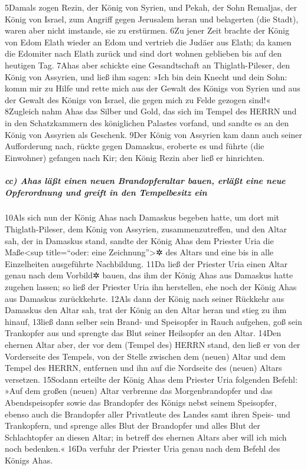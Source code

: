 5Damals zogen Rezin, der König von Syrien, und Pekah, der Sohn Remaljas,
der König von Israel, zum Angriff gegen Jerusalem heran und belagerten
(die Stadt), waren aber nicht imstande, sie zu erstürmen. 6Zu jener Zeit
brachte der König von Edom Elath wieder an Edom und vertrieb die Judäer
aus Elath; da kamen die Edomiter nach Elath zurück und sind dort wohnen
geblieben bis auf den heutigen Tag. 7Ahas aber schickte eine
Gesandtschaft an Thiglath-Pileser, den König von Assyrien, und ließ ihm
sagen: »Ich bin dein Knecht und dein Sohn: komm mir zu Hilfe und rette
mich aus der Gewalt des Königs von Syrien und aus der Gewalt des Königs
von Israel, die gegen mich zu Felde gezogen sind!« 8Zugleich nahm Ahas
das Silber und Gold, das sich im Tempel des HERRN und in den
Schatzkammern des königlichen Palastes vorfand, und sandte es an den
König von Assyrien als Geschenk. 9Der König von Assyrien kam dann auch
seiner Aufforderung nach, rückte gegen Damaskus, eroberte es und führte
(die Einwohner) gefangen nach Kir; den König Rezin aber ließ er
hinrichten.

\hypertarget{cc-ahas-luxe4uxdft-einen-neuen-brandopferaltar-bauen-erluxe4uxdft-eine-neue-opferordnung-und-greift-in-den-tempelbesitz-ein}{%
\subparagraph{cc) Ahas läßt einen neuen Brandopferaltar bauen, erläßt
eine neue Opferordnung und greift in den Tempelbesitz
ein}\label{cc-ahas-luxe4uxdft-einen-neuen-brandopferaltar-bauen-erluxe4uxdft-eine-neue-opferordnung-und-greift-in-den-tempelbesitz-ein}}

10Als sich nun der König Ahas nach Damaskus begeben hatte, um dort mit
Thiglath-Pileser, dem König von Assyrien, zusammenzutreffen, und den
Altar sah, der in Damaskus stand, sandte der König Ahas dem Priester
Uria die Maße\textless sup title=``oder: eine Zeichnung''\textgreater✲
des Altars und eine bis in alle Einzelheiten ausgeführte Nachbildung.
11Da ließ der Priester Uria einen Altar genau nach dem Vorbild✲ bauen,
das ihm der König Ahas aus Damaskus hatte zugehen lassen; so ließ der
Priester Uria ihn herstellen, ehe noch der König Ahas aus Damaskus
zurückkehrte. 12Als dann der König nach seiner Rückkehr aus Damaskus den
Altar sah, trat der König an den Altar heran und stieg zu ihm hinauf,
13ließ dann selber sein Brand- und Speisopfer in Rauch aufgehen, goß
sein Trankopfer aus und sprengte das Blut seiner Heilsopfer an den
Altar. 14Den ehernen Altar aber, der vor dem (Tempel des) HERRN stand,
den ließ er von der Vorderseite des Tempels, von der Stelle zwischen dem
(neuen) Altar und dem Tempel des HERRN, entfernen und ihn auf die
Nordseite des (neuen) Altars versetzen. 15Sodann erteilte der König Ahas
dem Priester Uria folgenden Befehl: »Auf dem großen (neuen) Altar
verbrenne das Morgenbrandopfer und das Abendspeisopfer sowie das
Brandopfer des Königs nebst seinem Speisopfer, ebenso auch die
Brandopfer aller Privatleute des Landes samt ihren Speis- und
Trankopfern, und sprenge alles Blut der Brandopfer und alles Blut der
Schlachtopfer an diesen Altar; in betreff des ehernen Altars aber will
ich mich noch bedenken.« 16Da verfuhr der Priester Uria genau nach dem
Befehl des Königs Ahas.

